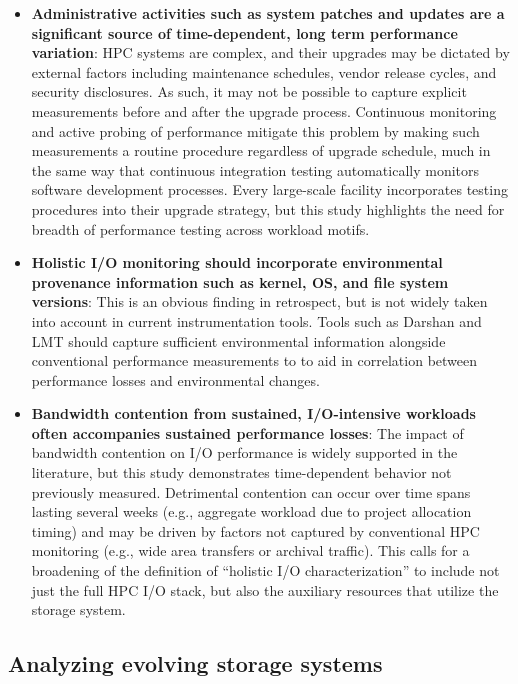 \begin{itemize}[leftmargin=*]

\item \textbf{Administrative activities such as system patches and updates are a significant source of time-dependent, long term performance variation}:
HPC systems are complex, and their upgrades may be dictated by external factors including maintenance schedules, vendor release cycles, and security disclosures.
As such, it may not be possible to capture explicit measurements before and after the upgrade process.
Continuous monitoring and active probing of performance mitigate this
problem by making such measurements a routine procedure regardless of
upgrade schedule, much in the same way that continuous integration testing automatically monitors software development processes.
Every large-scale facility incorporates testing procedures into their upgrade
strategy, but this study highlights the need for breadth of performance
testing across workload motifs.

\item \textbf{Holistic I/O monitoring should incorporate environmental
provenance information such as kernel, OS, and file system versions}: 
This is an obvious finding in retrospect, but is not widely taken into
account in current instrumentation tools.
Tools such as Darshan and LMT should capture sufficient environmental information alongside conventional performance measurements to
to aid in correlation between performance losses and environmental changes.

\item \textbf{Bandwidth contention from sustained, I/O-intensive workloads often accompanies sustained performance losses}:
The impact of bandwidth contention on I/O performance is widely supported in the literature, but this study demonstrates time-dependent behavior not previously measured.
Detrimental contention can occur over time spans lasting several weeks (e.g., aggregate workload due to project allocation timing) and may be driven by factors 
not captured by conventional HPC monitoring (e.g., wide area transfers or archival traffic).
This calls for a broadening of the definition of ``holistic I/O characterization'' to include not just the full HPC I/O stack, but also the auxiliary resources that utilize the storage system.

\end{itemize}


\subsection{Analyzing evolving storage systems}

